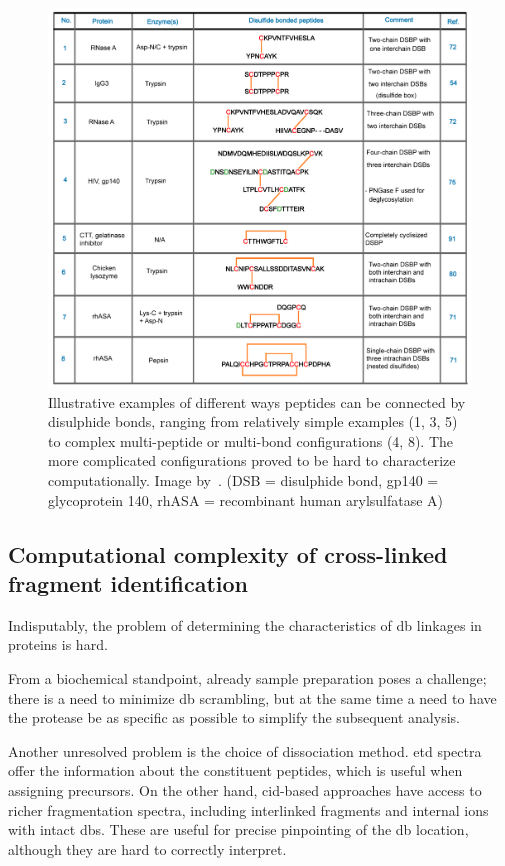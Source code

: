 \begin{figure}
  \centering
  \includegraphics[width=1\linewidth]{img/bond-types.png}
  \caption{Illustrative examples of different ways peptides can be connected by disulphide bonds, ranging from relatively simple examples (1, 3, 5) to complex multi-peptide or multi-bond configurations (4, 8). The more complicated configurations proved to be hard to characterize computationally. Image by~\citet{lakbub2018recent}. (DSB = disulphide bond, gp140 = glycoprotein 140, rhASA = recombinant human arylsulfatase A)}\label{fig:bond-types}
\end{figure}


\subsection{Computational complexity of cross-linked fragment identification}

Indisputably, the problem of determining the characteristics of \gls*{db} linkages in proteins is hard.

From a biochemical standpoint, already sample preparation poses a challenge; there is a need to minimize \gls*{db} scrambling, but at the same time a need to have the protease be as specific as possible to simplify the subsequent analysis.

Another unresolved problem is the choice of dissociation method. \gls*{etd} spectra offer the information about the constituent peptides, which is useful when assigning precursors. On the other hand, \gls*{cid}-based approaches have access to richer fragmentation spectra, including interlinked fragments and internal ions with intact \glspl*{db}. These are useful for precise pinpointing of the \gls*{db} location, although they are hard to correctly interpret.

